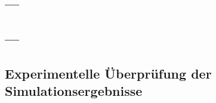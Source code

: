 \documentclass[12pt,a4paper,bibliography=totocnumbered,listof=totocnumbered]{scrartcl}
\begin{document}
\subsection{ --- }

\subsection{ --- }

\subsection{Experimentelle Überprüfung der Simulationsergebnisse}


\pagebreak

\renewcommand\refname{Quellenverzeichnis}


\end{document}
